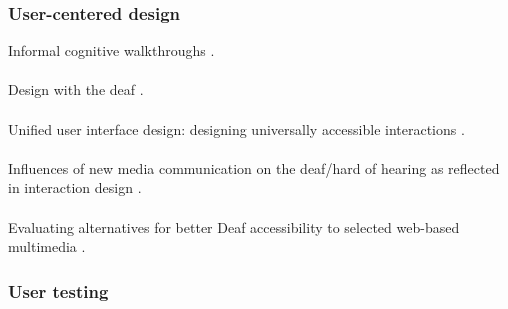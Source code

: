 \documentclass[english, 12pt, a4paper, pdftex, elec, utf8]{aaltothesis}
\begin{document}
\subsubsection{User-centered design}

Informal cognitive walkthroughs \cite{grigoreanu2013informal}. \\\\
Design with the deaf \cite{potter2014design}. \\\\
Unified user interface design: designing universally accessible interactions \cite{savidis2004unified}. \\\\
Influences of new media communication on the deaf/hard of hearing as reflected in interaction design \cite{chang2016}. \\\\
Evaluating alternatives for better Deaf accessibility to selected web-based multimedia \cite{shiver2015evaluating}.

\subsubsection{User testing}
\end{document}
